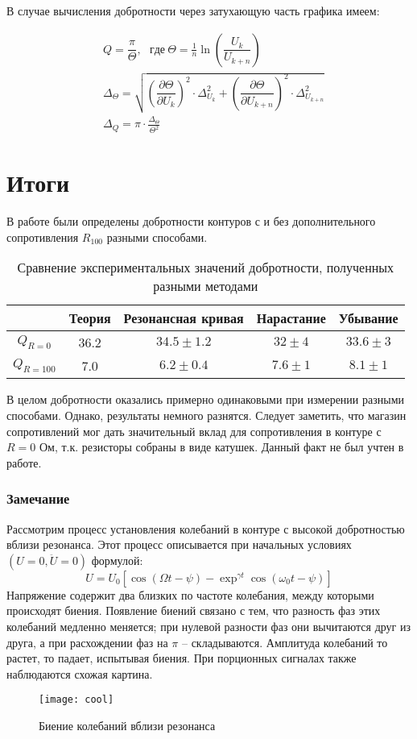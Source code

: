 \documentclass{lab}
\begin{document}
В случае вычисления добротности через затухающую часть графика имеем:

\begin{equation}
\begin{aligned}
	&Q = \dfrac{\pi}{\Theta} , ~~~ где \ \Theta = \frac{1}{n} \ln (\dfrac{U_k}{U_{k+n}})\\
	&\Delta_{\Theta} = \sqrt{\left( \dfrac{\partial {\Theta}}{\partial U_k} \right)^2 \cdot \Delta_{U_k}^2 + \left( \dfrac{\partial {\Theta}}{\partial U_{k+n}} \right)^2 \cdot \Delta_{U_{k+n}}^2}\\
	&\Delta_Q = \pi \cdot \frac{\Delta_{\Theta}}{\Theta^2}
\end{aligned}
\end{equation}

\section*{Итоги}

В работе были определены добротности контуров с и без дополнительного сопротивления
$ R_{100} $ разными способами.

\begin{table}[H]
	\centering
	\renewcommand{\arraystretch}{1.3}
	\begin{tabular}{|c|c|c|c|c|}
		\hline
		& Теория & Резонансная кривая & Нарастание & Убывание     \\ \hline
		$Q_{R=0}$   & 36.2   & $34.5 \pm 1.2$     & $32 \pm 4$ & $33.6 \pm 3$ \\ \hline
		$Q_{R=100}$ & 7.0   & $6.2 \pm 0.4$      & $7.6 \pm 1$  & $8.1 \pm 1$  \\ \hline
	\end{tabular}
	\caption{\footnotesize Сравнение экспериментальных значений добротности, полученных разными методами}
	\label{tab4}
	\renewcommand{\arraystretch}{1}
\end{table}

В целом добротности оказались примерно одинаковыми при измерении разными способами. Однако, результаты немного разнятся. Следует заметить, что магазин сопротивлений мог дать значительный вклад для сопротивления в контуре с $ R = 0 $ Ом, т.к. резисторы собраны в виде катушек. Данный факт не был учтен в работе.

\subsubsection*{Замечание}
Рассмотрим процесс установления колебаний в контуре с высокой добротностью вблизи резонанса.
Этот процесс описывается при начальных условиях $ (U = 0, \ddot{U} = 0) $ формулой:
$$ U = U_0[\cos(\Omega t - \psi) - \exp^{\gamma t} \cos (\omega_0 t - \psi)] $$
Напряжение содержит два близких по частоте колебания, между которыми происходят биения. Появление биений связано с тем, что разность фаз этих колебаний медленно меняется; при нулевой разности фаз они вычитаются друг из друга, а при расхождении фаз на $ \pi $ -- складываются. Амплитуда колебаний то растет, то падает, испытывая биения. При порционных сигналах также наблюдаются схожая картина.

\begin{figure}[!h]
	\centering
	\texttt{[image: cool]}
	\caption{\footnotesize Биение колебаний вблизи резонанса}
\end{figure}
\end{document}

